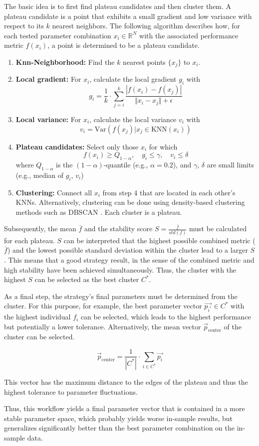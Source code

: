 The basic idea is to first find plateau candidates and then cluster them.
A plateau candidate is a point that exhibits a small gradient and low variance with respect to its $k$ nearest neighbors.
The following algorithm describes how, for each tested parameter combination $x_i \in \mathbb{R}^N$ with the associated performance metric $f(x_i)$, a point is determined to be a plateau candidate.

\begin{enumerate}
    \item \textbf{Knn-Neighborhood:} Find the $k$ nearest points $\{x_j\}$ to $x_i$.
    \item \textbf{Local gradient:} For $x_i$, calculate the local gradient $g_i$ with
    \[
        g_i = \frac{1}{k} \cdot \sum_{j=i}^{k} \frac{|f(x_i) - f(x_j)|}{\Vert x_i - x_j \Vert + \epsilon}
    \]
    \item \textbf{Local variance:} For $x_i$, calculate the local variance $v_i$ with
    \[
        v_i = \text{Var}(f(x_j) | x_j \in \text{KNN}(x_i))
    \]
    \item \textbf{Plateau candidates:} Select only those $x_i$ for which
    \[
        f(x_i) \geq Q_{1-\alpha}, \quad g_i \leq \gamma, \quad v_i \leq \delta
    \]
    where $Q_{1-\alpha}$ is the $(1 - \alpha)$-quantile (e.g., $\alpha = 0.2$), and $\gamma$, $\delta$ are small limits (e.g., median of $g_i$, $v_i$)
    \item \textbf{Clustering:} Connect all $x_i$ from step 4 that are located in each other's KNNs.
    Alternatively, clustering can be done using density-based clustering methods such as DBSCAN \cite{dbscan}.
    Each cluster is a plateau.
\end{enumerate}

\noindent
Subsequently, the mean $\bar{f}$ and the stability score $S = \frac{\bar{f}}{std(f)}$ must be calculated for each plateau.
$S$ can be interpreted that the highest possible combined metric ($\bar{f}$) and the lowest possible standard deviation within the cluster lead to a larger $S$.
This means that a good strategy result, in the sense of the combined metric and high stability have been achieved simultaneously.
Thus, the cluster with the highest $S$ can be selected as the best cluster $C^\ast$.

As a final step, the strategy's final parameters must be determined from the cluster.
For this purpose, for example, the best parameter vector $\vec{p_{i^\ast}} \in C^\ast$ with the highest individual $f_i$ can be selected, which leads to the highest performance but potentially a lower tolerance.
Alternatively, the mean vector $\vec{p}_{\text{center}}$ of the cluster can be selected.

\[
    \vec{p}_{\text{center}} = \frac{1}{|C^\ast|} \cdot \sum_{i \in C^\ast} \vec{p_i}
\]

\noindent
This vector has the maximum distance to the edges of the plateau and thus the highest tolerance to parameter fluctuations.

Thus, this workflow yields a final parameter vector that is contained in a more stable parameter space, which probably yields worse in-sample results, but generalizes significantly better than the best parameter combination on the in-sample data.

